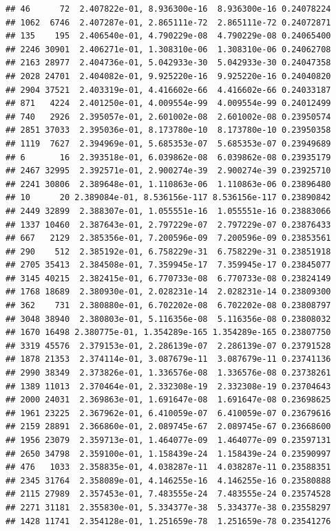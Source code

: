 \documentclass[
]{article}
\begin{document}
\begin{verbatim}
## 46      72  2.407822e-01, 8.936300e-16  8.936300e-16 0.24078224
## 1062  6746  2.407287e-01, 2.865111e-72  2.865111e-72 0.24072871
## 135    195  2.406540e-01, 4.790229e-08  4.790229e-08 0.24065400
## 2246 30901  2.406271e-01, 1.308310e-06  1.308310e-06 0.24062708
## 2163 28977  2.404736e-01, 5.042933e-30  5.042933e-30 0.24047358
## 2028 24701  2.404082e-01, 9.925220e-16  9.925220e-16 0.24040820
## 2904 37521  2.403319e-01, 4.416602e-66  4.416602e-66 0.24033187
## 871   4224  2.401250e-01, 4.009554e-99  4.009554e-99 0.24012499
## 740   2926  2.395057e-01, 2.601002e-08  2.601002e-08 0.23950574
## 2851 37033  2.395036e-01, 8.173780e-10  8.173780e-10 0.23950358
## 1119  7627  2.394969e-01, 5.685353e-07  5.685353e-07 0.23949689
## 6       16  2.393518e-01, 6.039862e-08  6.039862e-08 0.23935179
## 2467 32995  2.392571e-01, 2.900274e-39  2.900274e-39 0.23925710
## 2241 30806  2.389648e-01, 1.110863e-06  1.110863e-06 0.23896480
## 10      20 2.389084e-01, 8.536156e-117 8.536156e-117 0.23890842
## 2449 32899  2.388307e-01, 1.055551e-16  1.055551e-16 0.23883066
## 1337 10460  2.387643e-01, 2.797229e-07  2.797229e-07 0.23876433
## 667   2129  2.385356e-01, 7.200596e-09  7.200596e-09 0.23853561
## 290    512  2.385192e-01, 6.758229e-31  6.758229e-31 0.23851918
## 2705 35413  2.384508e-01, 7.359945e-17  7.359945e-17 0.23845077
## 3145 40215  2.382415e-01, 6.770733e-08  6.770733e-08 0.23824149
## 1768 18689  2.380930e-01, 2.028231e-14  2.028231e-14 0.23809300
## 362    731  2.380880e-01, 6.702202e-08  6.702202e-08 0.23808797
## 3048 38940  2.380803e-01, 5.116356e-08  5.116356e-08 0.23808032
## 1670 16498 2.380775e-01, 1.354289e-165 1.354289e-165 0.23807750
## 3319 45576  2.379153e-01, 2.286139e-07  2.286139e-07 0.23791528
## 1878 21353  2.374114e-01, 3.087679e-11  3.087679e-11 0.23741136
## 2990 38349  2.373826e-01, 1.336576e-08  1.336576e-08 0.23738261
## 1389 11013  2.370464e-01, 2.332308e-19  2.332308e-19 0.23704643
## 2000 24031  2.369863e-01, 1.691647e-08  1.691647e-08 0.23698625
## 1961 23225  2.367962e-01, 6.410059e-07  6.410059e-07 0.23679616
## 2159 28891  2.366860e-01, 2.089745e-67  2.089745e-67 0.23668600
## 1956 23079  2.359713e-01, 1.464077e-09  1.464077e-09 0.23597131
## 2650 34798  2.359100e-01, 1.158439e-24  1.158439e-24 0.23590997
## 476   1033  2.358835e-01, 4.038287e-11  4.038287e-11 0.23588351
## 2345 31764  2.358089e-01, 4.146255e-16  4.146255e-16 0.23580888
## 2115 27989  2.357453e-01, 7.483555e-24  7.483555e-24 0.23574528
## 2271 31181  2.355830e-01, 5.334377e-38  5.334377e-38 0.23558297
## 1428 11741  2.354128e-01, 1.251659e-78  1.251659e-78 0.23541276

\end{verbatim}
\end{document}
